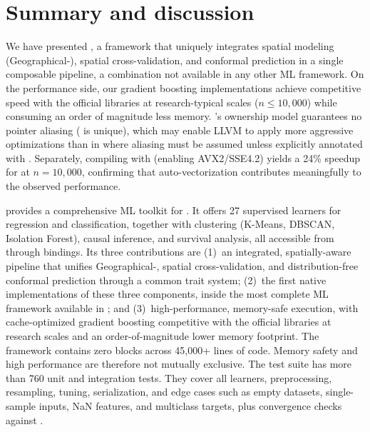 \documentclass[article]{jss}
\begin{document}

\section{Summary and discussion} \label{sec:summary}

We have presented , a  framework that uniquely
integrates spatial modeling (Geographical-), spatial
cross-validation, and conformal prediction in a single composable pipeline,
a combination not available in any other ML framework. On the performance
side, our gradient boosting implementations achieve competitive speed with
the official  libraries at research-typical scales
($n \leq 10{,}000$) while consuming an order of magnitude less memory.
's ownership model guarantees no pointer aliasing
( is unique), which may enable LLVM to apply more aggressive
optimizations than in  where aliasing must be assumed unless
explicitly annotated with . Separately, compiling with
 (enabling AVX2/SSE4.2) yields a 24\% speedup for
 at $n = 10{,}000$, confirming that auto-vectorization
contributes meaningfully to the observed performance.

 provides a comprehensive ML toolkit for . It
offers 27 supervised learners for regression and classification, together with
clustering (K-Means, DBSCAN, Isolation Forest), causal inference, and survival
analysis, all accessible from  through  bindings.
Its three contributions are (1)~an integrated, spatially-aware pipeline that
unifies Geographical-, spatial cross-validation, and
distribution-free conformal prediction through a common trait system; (2)~the
first native  implementations of these three components, inside
the most complete ML framework available in ; and
(3)~high-performance, memory-safe execution, with cache-optimized gradient
boosting competitive with the official  libraries at research
scales and an order-of-magnitude lower memory footprint. The framework contains
zero  blocks across 45{,}000+ lines of code. Memory safety and
high performance are therefore not mutually exclusive. The test suite has more
than 760 unit and integration tests. They cover all learners, preprocessing,
resampling, tuning, serialization, and edge cases such as empty datasets,
single-sample inputs, NaN features, and multiclass targets, plus convergence
checks against .
\end{document}

